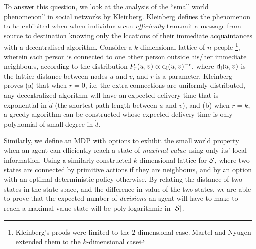 \label{sec:approach}

To answer this question, we look at the analysis of the ``small world
phenomenon'' in social networks by Kleinberg. Kleinberg defines the phenomenon
to be exhibited when when individuals can {\em efficiently} transmit a message
from source to destination knowing only the locations of their immediate
acquaintances with a decentralised algorithm. 
Consider a $k$-dimensional lattice of $n$ people \footnote{ Kleinberg's proofs
were limited to the $2$-dimensional case. Martel and Nyugen \cite{Martel2004}
extended them to the $k$-dimensional case }, wherein each person is connected to
one other person outside his/her immediate neighbours, according to the
distribution $P_{r}( u, v ) \propto \operatorname{d_l}(u,v)^{-r}$, where $\operatorname{d_l}(u,v)$
is the lattice distance between nodes $u$ and $v$, and $r$ is a parameter.
Kleinberg proves (a) that when $r=0$, i.e. the extra connections are uniformly
distributed, any decentralized algorithm will have an expected delivery time
that is exponential in $\tilde{d}$ (the shortest path length between $u$ and
$v$), and (b) when $r=k$, a greedy algorithm can be constructed whose expected
delivery time is only polynomial of small degree in $\tilde{d}$.

Similarly, we define an MDP with options to exhibit the small world property
when an agent can efficiently reach a state of {\em maximal value} using only
its' local information. Using a similarly constructed $k$-dimensional lattice
for $\mathcal{S}$, where two states are connected by primitive actions if they are
neighbours, and by an option with an optimal deterministic policy otherwise. By
relating the distance of two states in the state space, and the difference in
value of the two states, we are able to prove that the expected number of {\em
decisions} an agent will have to make to reach a maximal value state will be poly-logarithmic in
$|\mathcal{S}|$.
